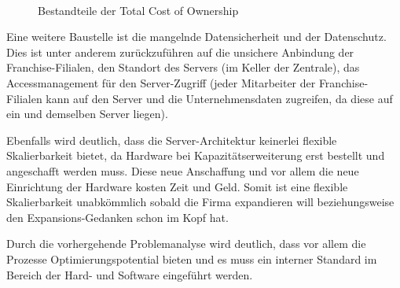 
\begin{figure}[H]
\centering
\begin{minipage}[t]{0.8\textwidth}
{\centering{}\\}
\caption{Bestandteile der Total Cost of Ownership} %
\end{minipage}
\end{figure}

Eine weitere Baustelle ist die mangelnde Datensicherheit und der
Datenschutz. Dies ist unter anderem zurückzuführen auf die unsichere
Anbindung der Franchise-Filialen, den Standort des Servers (im Keller
der Zentrale), das Accessmanagement für den Server-Zugriff (jeder
Mitarbeiter der Franchise-Filialen kann auf den Server und die
Unternehmensdaten zugreifen, da diese auf ein und demselben Server
liegen).

Ebenfalls wird deutlich, dass die Server-Architektur keinerlei
flexible Skalierbarkeit bietet, da Hardware bei Kapazitätserweiterung
erst bestellt und angeschafft werden muss. Diese neue Anschaffung und
vor allem die neue Einrichtung der Hardware kosten Zeit und
Geld. Somit ist eine flexible Skalierbarkeit unabkömmlich sobald die
Firma expandieren will beziehungsweise den Expansions-Gedanken schon
im Kopf hat.

Durch die vorhergehende Problemanalyse wird deutlich, dass vor allem
die Prozesse Optimierungspotential bieten und es muss ein interner
Standard im Bereich der Hard- und Software eingeführt werden.

